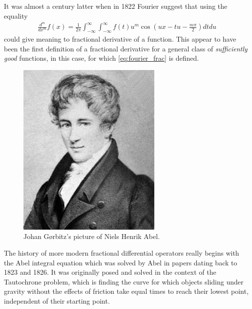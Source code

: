 It was almost a century latter when in 1822 Fourier suggest that using the equality
\begin{align}
    \label{eq:fourier_frac}
    \frac{d^m}{dx^m} f(x) = \frac{1}{2\pi} \int_{-\infty}^\infty \int_{-\infty}^\infty f(t)u^m \cos\left(ux - tu - \frac{m\pi}{2}\right) dt du
\end{align}
could give meaning to fractional derivative of a function. This appear to have been the first definition of a fractional derivative for a general class of \emph{sufficiently good} functions, in this case, for which \eqref{eq:fourier_frac} is defined.

\begin{figure}
    \includegraphics[scale=0.5]{images/Niels_Henrik_Abel}
    \caption{Johan Gørbitz's picture of Niels Henrik Abel.}
\end{figure}

The history of more modern fractional differential operators really begins with the Abel integral equation which was solved by Abel in papers dating back to 1823 and 1826. It was originally posed and solved in the context of the Tautochrone problem, which is finding the curve for which objects sliding under gravity without the effects of friction take equal times to reach their lowest point, independent of their starting point.

